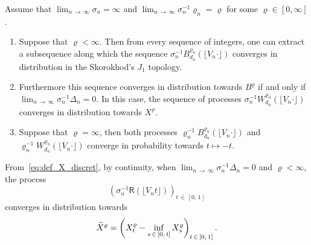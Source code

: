 \documentclass[AHL,Unicode,longabstracts,published]{cedram}
\newcommand{\1}{\ensembles{1}}
\newcommand{\tildep}[1]{\widetilde{#1}\vphantom{#1}}
\newcommand{\RR}{\mathsf{R}}
\newcommand{\Wfn}{W_{d_n}^{\varrho_n}}
\newcommand{\Bfn}{B_{d_n}^{\varrho_n}}
\newcommand{\tX}{\tildep{X}^{\varrho}}
\newcommand{\vertices}{V}
\begin{document}
\begin{prop}\label{prop:convergence_Luka}
Assume that $\lim_{n\,\to\,\infty} \sigma_n = \infty$ and $\lim_{n\,\to\,\infty} \sigma_n^{-1} \varrho_n = \varrho$ for some $\varrho \in [0, \infty]$.
\begin{enumerate}
\item Suppose that $\varrho < \infty$. Then from every sequence of integers, one can extract a subsequence along which the sequence $\sigma_n^{-1} \Bfn(\lfloor \vertices_n \cdot \rfloor)$ converges in distribution in the Skorokhod's $J_1$ topology.

\item Furthermore this sequence converges in distribution towards $B^\varrho$ if and only if $\lim_{n\,\to\,\infty} \sigma_n^{-1} \Delta_n = 0$. In this case, the sequence of processes $\sigma_n^{-1} \Wfn(\lfloor \vertices_n \cdot \rfloor)$ converges in distribution towards $X^\varrho$.

\item Suppose that $\varrho = \infty$, then both processes $\varrho_n^{-1} \Bfn(\lfloor \vertices_n \cdot \rfloor)$ and $\varrho_n^{-1} \Wfn(\lfloor \vertices_n \cdot \rfloor)$ converge in probability towards $t \mapsto -t$.
\end{enumerate}
\end{prop}

From~\eqref{eq:def_X_discret}, by continuity, when $\lim_{n\,\to\,\infty} \sigma_n^{-1} \Delta_n = 0$ and $\varrho < \infty$, the process
\[
\left(\sigma_n^{-1} \RR\left(\lfloor \vertices_n t\rfloor\right)\right)_{t\,\in\,[0,\,1]}
\]
converges in distribution towards 
\[
\tX = \left(X^\varrho_t - \inf_{s\,\in\,[0,\,t]} X^\varrho_s\right)_{t\,\in\,[0,\,1]}.
\]
\end{document}
